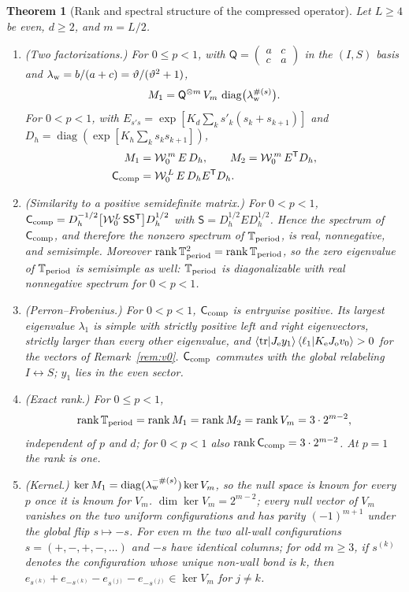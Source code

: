 \documentclass[aps,prx,reprint,superscriptaddress,nobibnotes,longbibliography]{revtex4-2}
\newtheorem{theorem}{Theorem}
\theoremstyle{remark}
\newcommand{\rk}{\operatorname{rank}}
\newcommand{\vth}{\vartheta}
\newcommand{\Ccomp}{\mathsf C_{\rm comp}}
\newcommand{\Tper}{\mathbb T_{\rm period}}
\begin{document}
\begin{theorem}[Rank and spectral structure of the compressed operator]
\label{thm:rank}
Let $L\ge4$ be even, $d\ge2$, and $m=L/2$.
\begin{enumerate}
\item[(i)] (Two factorizations.)  For $0\le p<1$, with $\mathsf Q=\begin{pmatrix}a&c\\c&a\end{pmatrix}$ in the $(I,S)$ basis and $\lambda_{\rm w}=b/(a+c)=\vth/(\vth^2+1)$,
\begin{equation}
 M_1=\mathsf Q^{\otimes m}\,V_m\,\operatorname{diag}\bigl(\lambda_{\rm w}^{\#(s)}\bigr).
 \label{eq:factorQ}
\end{equation}
For $0<p<1$, with $E_{s's}=\exp[K_d\sum_ks'_k(s_k+s_{k+1})]$ and $D_h=\operatorname{diag}(\exp[K_h\sum_ks_ks_{k+1}])$,
\begin{align}
 M_1&=\mathcal W_0^{\,m}\,E\,D_h,\qquad M_2=\mathcal W_0^{\,m}\,E^{\mathsf T}D_h,\nonumber\\
 \Ccomp&=\mathcal W_0^{\,L}\,E\,D_hE^{\mathsf T}D_h.
 \label{eq:Isingform}
\end{align}
\item[(ii)] (Similarity to a positive semidefinite matrix.)  For $0<p<1$, $\Ccomp=D_h^{-1/2}\bigl[\mathcal W_0^{L}\,\mathsf S\mathsf S^{\mathsf T}\bigr]D_h^{1/2}$ with $\mathsf S=D_h^{1/2}ED_h^{1/2}$.  Hence the spectrum of $\Ccomp$, and therefore the nonzero spectrum of $\Tper$, is real, nonnegative, and semisimple.  Moreover $\rk\Tper^2=\rk\Tper$, so the zero eigenvalue of $\Tper$ is semisimple as well: $\Tper$ is diagonalizable with real nonnegative spectrum for $0<p<1$.
\item[(iii)] (Perron--Frobenius.)  For $0<p<1$, $\Ccomp$ is entrywise positive.  Its largest eigenvalue $\lambda_1$ is simple with strictly positive left and right eigenvectors, strictly larger than every other eigenvalue, and $\langle\mathrm{tr}|J_{\rm e}y_1\rangle\,\langle\ell_1|K_{\rm e}J_{\rm o}v_0\rangle>0$ for the vectors of Remark~\ref{rem:v0}.  $\Ccomp$ commutes with the global relabeling $I\leftrightarrow S$; $y_1$ lies in the even sector.
\item[(iv)] (Exact rank.)  For $0\le p<1$,
\begin{equation}
 \rk\Tper=\rk M_1=\rk M_2=\rk V_m=3\cdot2^{m-2},
 \label{eq:rankexact}
\end{equation}
independent of $p$ and $d$; for $0<p<1$ also $\rk\Ccomp=3\cdot2^{m-2}$.  At $p=1$ the rank is one.
\item[(v)] (Kernel.)  $\ker M_1=\operatorname{diag}(\lambda_{\rm w}^{-\#(s)})\ker V_m$, so the null space is known for every $p$ once it is known for $V_m$.  $\dim\ker V_m=2^{m-2}$; every null vector of $V_m$ vanishes on the two uniform configurations and has parity $(-1)^{m+1}$ under the global flip $s\mapsto-s$.  For even $m$ the two all-wall configurations $s=(+,-,+,-,\ldots)$ and $-s$ have identical columns; for odd $m\ge3$, if $s^{(k)}$ denotes the configuration whose unique non-wall bond is $k$, then $e_{s^{(k)}}+e_{-s^{(k)}}-e_{s^{(j)}}-e_{-s^{(j)}}\in\ker V_m$ for $j\ne k$.
\end{enumerate}
\end{theorem}
\end{document}

